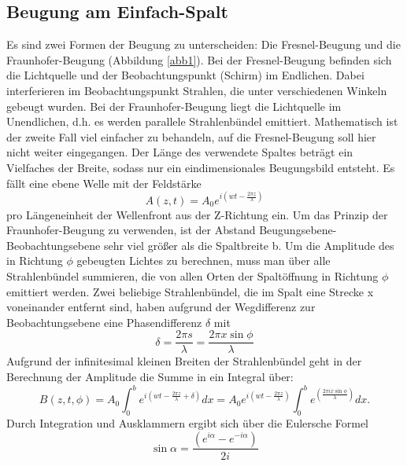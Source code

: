 \documentclass[11pt,ngerman,a4paper]{article}
\begin{document}
\subsection{Beugung am Einfach-Spalt}
Es sind zwei Formen der Beugung zu unterscheiden: Die Fresnel-Beugung und die Fraunhofer-Beugung (Abbildung \ref{abb1}).\newline
Bei der Fresnel-Beugung befinden sich die Lichtquelle und der Beobachtungspunkt (Schirm) im Endlichen. Dabei interferieren im Beobachtungspunkt Strahlen, die unter verschiedenen Winkeln gebeugt wurden. Bei der Fraunhofer-Beugung liegt die Lichtquelle im Unendlichen, d.h. es werden parallele Strahlenbündel emittiert. Mathematisch ist der zweite Fall viel einfacher zu behandeln, auf die Fresnel-Beugung soll hier nicht weiter eingegangen.
Der Länge des verwendete Spaltes beträgt ein Vielfaches der Breite, sodass nur ein eindimensionales Beugungsbild entsteht.
Es fällt eine ebene Welle mit der Feldstärke
\begin{equation}
A(z,t) = A_0 e^{i(wt- \frac{2\pi z}{ \lambda} )}
\end{equation}
pro Längeneinheit der Wellenfront aus der Z-Richtung ein.
Um das Prinzip der Fraunhofer-Beugung zu verwenden, ist der Abstand Beugungsebene-Beobachtungsebene sehr viel größer als die Spaltbreite b.\newline
Um die Amplitude des in Richtung $\phi$ gebeugten Lichtes zu berechnen, muss man über alle Strahlenbündel summieren, die von allen Orten der Spaltöffnung in Richtung $\phi$ emittiert werden. Zwei beliebige Strahlenbündel, die im Spalt eine Strecke x voneinander entfernt sind, haben aufgrund der Wegdifferenz zur Beobachtungsebene eine Phasendifferenz $\delta$ mit
\begin{equation}
\delta = \frac{2 \pi s}{\lambda} = \frac{2 \pi x \sin \phi}{\lambda}
\end{equation}
Aufgrund der infinitesimal kleinen Breiten der Strahlenbündel geht in der Berechnung der Amplitude die Summe in ein Integral über:
\begin{equation}
B (z, t, \phi) = A_0 \int_0^b {e^{i\left(wt-\frac{2 \pi z}{\lambda}+ \delta \right) } dx} = A_0 e^{i \left( wt- \frac{2 \pi z}{\lambda} \right)} \int_0^b {e^{\left( \frac{2 \pi i x \sin \phi}{\lambda} \right) }} dx.
\end{equation}
Durch Integration und Ausklammern ergibt sich über die Eulersche Formel
\begin{equation}
\sin \alpha = \frac{\left( e^{i \alpha} - e^{-i \alpha} \right)}{2i}
\end{equation}
\end{document}
